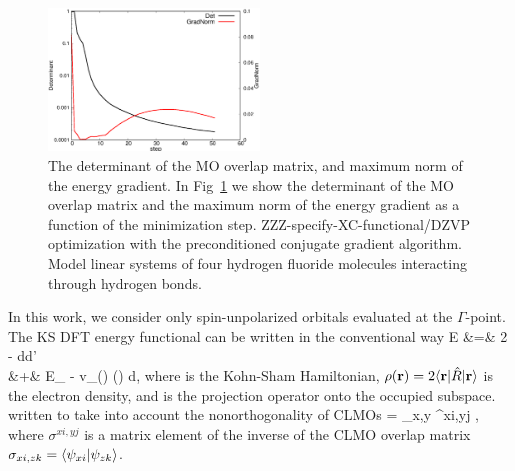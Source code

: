 \documentclass[aps,prl,twocolumn,reprint,amsmath,amssymb]{revtex4-1}
\begin{document}
\begin{figure}
\includegraphics[width=0.5\textwidth]{det}
\caption{
The determinant of the MO overlap matrix, and maximum norm of the energy gradient. In Fig~\ref{fig:det} we show the determinant of the MO overlap matrix and the maximum norm of the energy gradient as a function of the minimization step. ZZZ-specify-XC-functional/DZVP optimization with the preconditioned conjugate gradient algorithm. Model linear systems of four hydrogen fluoride molecules interacting through hydrogen bonds.}
\label{fig:det}
\end{figure}

In this work, we consider only spin-unpolarized orbitals evaluated at the $\Gamma$-point. The KS DFT energy functional can be written in the conventional way 
\bea
E &=& 2 \trace \left[ \op{R} \op{H} \right] -  \int\int {}d\br d\br' \nonumber \\
 &+& E_{} - \int v_{}(\br) \rho(\br) d\br,
\eea
%
where  is the Kohn-Sham Hamiltonian, $\rho(\mathbf{r}) = 2\langle \mathbf{r} \vert\hat{R}\vert \mathbf{r} \rangle$ is the electron density, and  is the projection operator onto the occupied subspace.  written to take into account the nonorthogonality of CLMOs
\bea \label{eq:dm}
 = \sum_{x,y}  \sigma^{xi,yj} ,
\eea
%
where $\sigma^{xi,yj}$ is a matrix element of the inverse of the CLMO overlap matrix $\sigma_{xi,zk} = \langle  \psi_{xi} \vert  \psi_{zk} \rangle $. %
\end{document}
